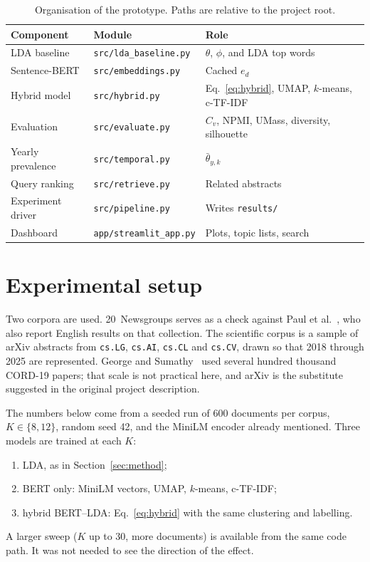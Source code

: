 \documentclass[11pt,a4paper]{article}
\begin{document}
\begin{table}[htbp]
\centering
\caption{Organisation of the prototype. Paths are relative to the project root.}
\label{tab:impl}
\small
\begin{tabular}{@{}p{3.6cm}p{5.4cm}p{5.4cm}@{}}
\toprule
Component & Module & Role \\
\midrule
LDA baseline & \texttt{src/lda\_baseline.py} & $\theta$, $\phi$, and LDA top words \\
Sentence-BERT & \texttt{src/embeddings.py} & Cached $e_d$ \\
Hybrid model & \texttt{src/hybrid.py} & Eq.~\eqref{eq:hybrid}, UMAP, $k$-means, c-TF-IDF \\
Evaluation & \texttt{src/evaluate.py} & $C_v$, NPMI, UMass, diversity, silhouette \\
Yearly prevalence & \texttt{src/temporal.py} & $\bar\theta_{y,k}$ \\
Query ranking & \texttt{src/retrieve.py} & Related abstracts \\
Experiment driver & \texttt{src/pipeline.py} & Writes \texttt{results/} \\
Dashboard & \texttt{app/streamlit\_app.py} & Plots, topic lists, search \\
\bottomrule
\end{tabular}
\end{table}

\section{Experimental setup}
\label{sec:setup}

Two corpora are used. 20~Newsgroups serves as a check against Paul et al.~\cite{paul2025}, who also report English results on that collection. The scientific corpus is a sample of arXiv abstracts from \texttt{cs.LG}, \texttt{cs.AI}, \texttt{cs.CL} and \texttt{cs.CV}, drawn so that 2018 through 2025 are represented. George and Sumathy~\cite{george2023} used several hundred thousand CORD-19 papers; that scale is not practical here, and arXiv is the substitute suggested in the original project description.

The numbers below come from a seeded run of 600 documents per corpus, $K\in\{8,12\}$, random seed 42, and the MiniLM encoder already mentioned. Three models are trained at each $K$:
\begin{enumerate}[leftmargin=1.4em,itemsep=0.25em]
  \item LDA, as in Section~\ref{sec:method};
  \item BERT only: MiniLM vectors, UMAP, $k$-means, c-TF-IDF;
  \item hybrid BERT--LDA: Eq.~\eqref{eq:hybrid} with the same clustering and labelling.
\end{enumerate}
A larger sweep ($K$ up to 30, more documents) is available from the same code path. It was not needed to see the direction of the effect.
\end{document}
